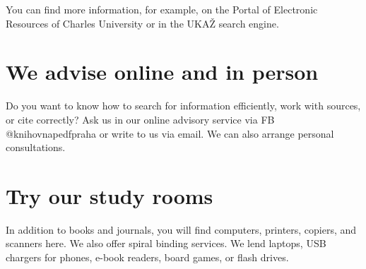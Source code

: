 You can find more information, for example, on the Portal of Electronic
Resources of Charles University or in the UKAŽ search engine.



\ikonka{\faInfoCircle}
\section{We advise online and in person} 

Do you want to know how to search for information efficiently, work with
sources, or cite correctly? Ask us in our online advisory service via FB
@knihovnapedfpraha or write to us via email. We can also arrange personal
consultations.




\ikonka{\faGraduationCap}
\section{Try our study rooms}

In addition to books and journals, you will find computers, printers, copiers,
and scanners here. We also offer spiral binding services. We lend laptops, USB
chargers for phones, e-book readers, board games, or flash drives.

